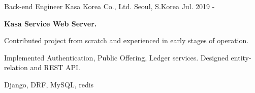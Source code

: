 

\begin{cventries}
  \cventry
  {Back-end Engineer} %
  {Kasa Korea Co., Ltd.} %
  {Seoul, S.Korea} %
  {Jul. 2019 - } %
  {
      \begin{cvitems} %
        \item[] {\textbf{Kasa Service Web Server.}}
        \item {Contributed project from scratch and experienced in early stages of operation.}
        \item {Implemented Authentication, Public Offering, Ledger services. Designed entity-relation and REST API.}
        \item {Django, DRF, MySQL, redis}
      \end{cvitems}
    }


\end{cventries}

